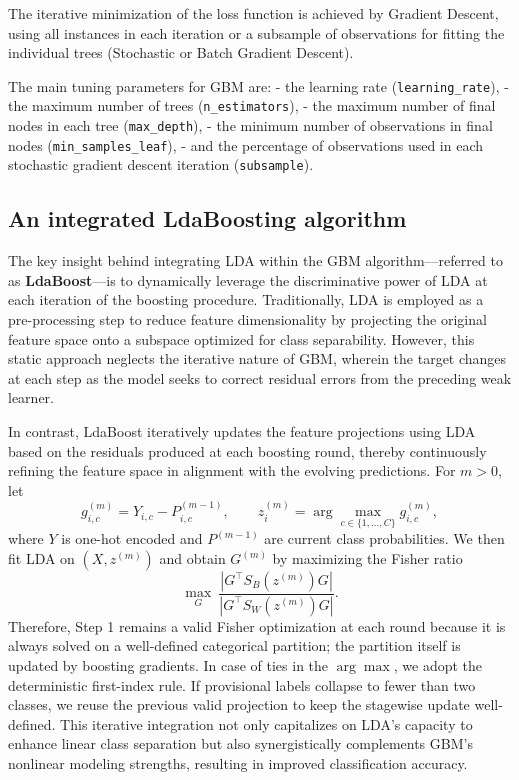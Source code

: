 \documentclass[11pt,a4paper]{article}
\begin{document}
The iterative minimization of the loss function is achieved by Gradient Descent, using all instances in each iteration or a subsample of observations for fitting the individual trees (Stochastic or Batch Gradient Descent).

The main tuning parameters for GBM are:  
- the learning rate (\texttt{learning\_rate}),  
- the maximum number of trees (\texttt{n\_estimators}),  
- the maximum number of final nodes in each tree (\texttt{max\_depth}),  
- the minimum number of observations in final nodes (\texttt{min\_samples\_leaf}),  
- and the percentage of observations used in each stochastic gradient descent iteration (\texttt{subsample}).


\subsection{An integrated LdaBoosting algorithm}
The key insight behind integrating LDA within the GBM algorithm—referred to as \textbf{LdaBoost}—is to dynamically leverage the discriminative power of LDA at each iteration of the boosting procedure.  
Traditionally, LDA is employed as a pre-processing step to reduce feature dimensionality by projecting the original feature space onto a subspace optimized for class separability.  
However, this static approach neglects the iterative nature of GBM, wherein the target changes at each step as the model seeks to correct residual errors from the preceding weak learner.

In contrast, LdaBoost iteratively updates the feature projections using LDA based on the residuals produced at each boosting round, thereby continuously refining the feature space in alignment with the evolving predictions.  
For $m>0$, let
\[
g^{(m)}_{i,c} = Y_{i,c} - P^{(m-1)}_{i,c}, \qquad
z^{(m)}_i = \arg\max_{c\in\{1,\dots,C\}} g^{(m)}_{i,c},
\]
where $Y$ is one-hot encoded and $P^{(m-1)}$ are current class probabilities. We then fit LDA on $(X, z^{(m)})$ and obtain $G^{(m)}$ by maximizing the Fisher ratio
\[
\max_G\ \frac{|G^\top S_B(z^{(m)})G|}{|G^\top S_W(z^{(m)})G|}.
\]
Therefore, Step 1 remains a valid Fisher optimization at each round because it is always solved on a well-defined categorical partition; the partition itself is updated by boosting gradients. In case of ties in the $\arg\max$, we adopt the deterministic first-index rule. If provisional labels collapse to fewer than two classes, we reuse the previous valid projection to keep the stagewise update well-defined.  
This iterative integration not only capitalizes on LDA’s capacity to enhance linear class separation but also synergistically complements GBM’s nonlinear modeling strengths, resulting in improved classification accuracy.  
\end{document}
